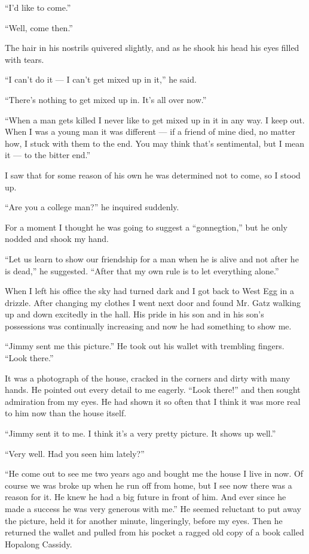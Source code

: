 \documentclass{znotebook}
\begin{document}
``I’d like to come.''

``Well, come then.''

The hair in his nostrils quivered slightly, and as he shook his head his eyes filled with tears.

``I can’t do it — I can’t get mixed up in it,'' he said.

``There’s nothing to get mixed up in. It’s all over now.''

``When a man gets killed I never like to get mixed up in it in any way. I keep out. When I was a young man it was different — if a friend of mine died, no matter how, I stuck with them to the end. You may think that’s sentimental, but I mean it — to the bitter end.''

I saw that for some reason of his own he was determined not to come, so I stood up.

``Are you a college man?'' he inquired suddenly.

For a moment I thought he was going to suggest a ``gonnegtion,'' but he only nodded and shook my hand.

``Let us learn to show our friendship for a man when he is alive and not after he is dead,'' he suggested. ``After that my own rule is to let everything alone.''

When I left his office the sky had turned dark and I got back to West Egg in a drizzle. After changing my clothes I went next door and found Mr. Gatz walking up and down excitedly in the hall. His pride in his son and in his son’s possessions was continually increasing and now he had something to show me.

``Jimmy sent me this picture.'' He took out his wallet with trembling fingers. ``Look there.''

It was a photograph of the house, cracked in the corners and dirty with many hands. He pointed out every detail to me eagerly. ``Look there!'' and then sought admiration from my eyes. He had shown it so often that I think it was more real to him now than the house itself.

``Jimmy sent it to me. I think it’s a very pretty picture. It shows up well.''

``Very well. Had you seen him lately?''

``He come out to see me two years ago and bought me the house I live in now. Of course we was broke up when he run off from home, but I see now there was a reason for it. He knew he had a big future in front of him. And ever since he made a success he was very generous with me.'' He seemed reluctant to put away the picture, held it for another minute, lingeringly, before my eyes. Then he returned the wallet and pulled from his pocket a ragged old copy of a book called Hopalong Cassidy.
\end{document}
